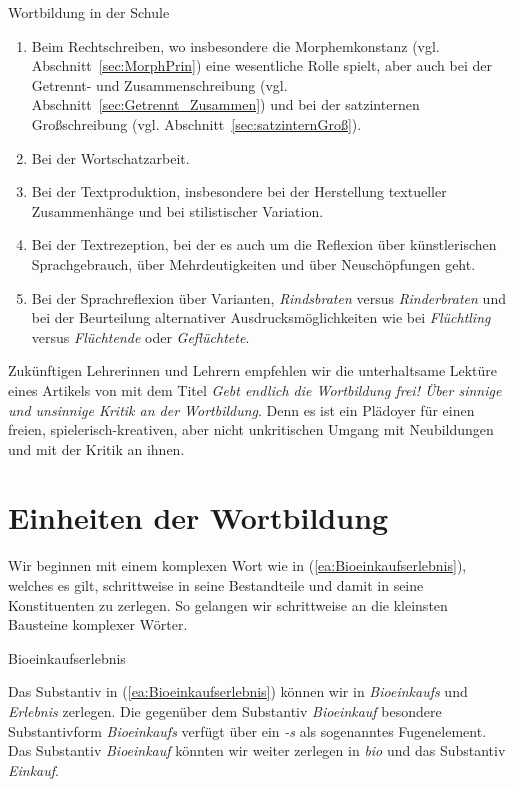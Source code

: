 \begin{Exkurs}{Wortbildung in der Schule}
\begin{enumerate}
\item Beim Rechtschreiben, wo insbesondere die Morphemkonstanz (vgl. Abschnitt~\ref{sec:MorphPrin}) eine wesentliche Rolle spielt, aber auch bei der Getrennt- und Zusammenschreibung (vgl. Abschnitt~\ref{sec:Getrennt_Zusammen}) und bei der satzinternen Großschreibung (vgl. Abschnitt~\ref{sec:satzinternGroß}).

\item Bei der Wortschatzarbeit.

\item Bei der Textproduktion, insbesondere bei der Herstellung textueller Zusammenhänge und bei stilistischer Variation. 

\item Bei der Textrezeption, bei der es auch um die Reflexion über künstlerischen Sprachgebrauch, über Mehrdeutigkeiten und über Neuschöpfungen geht.

\item Bei der Sprachreflexion über Varianten, \zB \textit{Rindsbraten} versus \textit{Rinderbraten} und bei der Beurteilung alternativer Ausdrucksmöglichkeiten wie \zB bei \textit{Flüchtling} versus \textit{Flüchtende} oder \textit{Geflüchtete}.

\end{enumerate}

Zukünftigen Lehrerinnen und Lehrern empfehlen wir die unterhaltsame Lektüre eines Artikels von \citet{Donalies2003Wbfrei} mit dem Titel \textit{Gebt endlich die Wortbildung frei! Über sinnige und unsinnige Kritik an der Wortbildung}. Denn es ist ein Plädoyer für einen freien, spielerisch-kreativen, aber nicht unkritischen Umgang mit Neubildungen und mit der Kritik an ihnen.  

\end{Exkurs}


  
\section{Einheiten der Wortbildung}\label{section:Einheiten Wortbildung}

Wir beginnen mit einem komplexen Wort wie in (\ref{ea:Bioeinkaufserlebnis}), welches es gilt, schrittweise in seine Bestandteile und damit in seine Konstituenten zu zerlegen. So gelangen wir schrittweise an die kleinsten Bausteine komplexer Wörter. 

\ea \label{ea:Bioeinkaufserlebnis} Bioeinkaufserlebnis
\z

Das Substantiv in (\ref{ea:Bioeinkaufserlebnis}) können wir in \textit{Bioeinkaufs} und \textit{Erlebnis} zerlegen. Die gegenüber dem Substantiv \textit{Bioeinkauf} besondere Substantivform \textit{Bioeinkaufs} verfügt über ein \textit{-s} als sogenanntes Fugenelement. Das Substantiv \textit{Bioeinkauf} könnten wir weiter zerlegen in \textit{bio} und das Substantiv \textit{Einkauf}.

